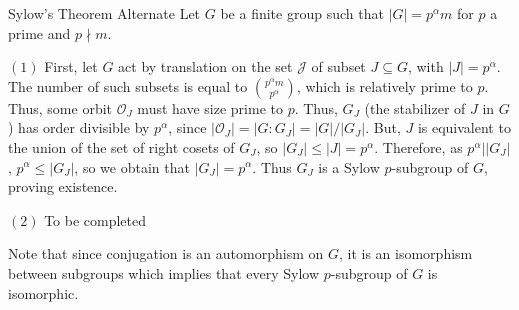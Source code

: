 \documentclass[12pt, a4paper, twoside, openright, titlepage]{book}
\begin{document}
\begin{proof*}{Sylow's Theorem Alternate}{}
    Let $G$ be a finite group such that $|G| = p^{\alpha}m$ for $p$ a prime and $p\nmid m$. 

    $(1)$ First, let $G$ act by translation on the set $\mathcal{J}$ of subset $J \subseteq G$, with $|J| = p^{\alpha}$. The number of such subsets is equal to $\binom{p^{\alpha}m}{p^{\alpha}}$, which is relatively prime to $p$. Thus, some orbit $\mathcal{O}_J$ must have size prime to $p$. Thus, $G_J$ (the stabilizer of $J$ in $G$) has order divisible by $p^{\alpha}$, since $|\mathcal{O}_J| = |G:G_J| = |G|/|G_J|$. But, $J$ is equivalent to the union of the set of right cosets of $G_J$, so $|G_J|\leq |J| = p^{\alpha}$. Therefore, as $p^{\alpha}\vert|G_J|$, $p^{\alpha}\leq |G_J|$, so we obtain that $|G_J| = p^{\alpha}$. Thus $G_J$ is a Sylow $p$-subgroup of $G$, proving existence.


    $(2)$ To be completed 
\end{proof*}

Note that since conjugation is an automorphism on $G$, it is an isomorphism between subgroups which implies that every Sylow $p$-subgroup of $G$ is isomorphic.
\end{document}
